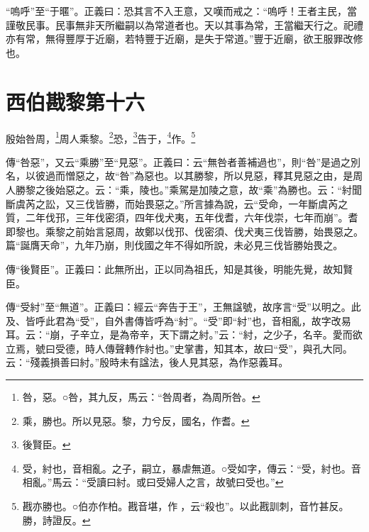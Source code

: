 {\noindent\shu{}\fzkt “嗚呼”至“于暱”。正義曰：恐其言不入王意，又嘆而戒之：“嗚呼！王者主民，當謹敬民事。民事無非天所繼嗣以為常道者也。天以其事為常，王當繼天行之。祀禮亦有常，無得豐厚于近廟，若特豐于近廟，是失于常道。”豐于近廟，欲王服罪改修也。 \par}

\section{西伯戡黎第十六}


殷始咎周，\footnote{咎，惡。○咎，其九反，馬云：“咎周者，為周所咎。}周人乘黎。\footnote{乘，勝也。所以見惡。黎，力兮反，國名，作耆。}恐，\footnote{後賢臣。}告于，\footnote{受，紂也，音相亂。之子，嗣立，暴虐無道。○受如字，傳云：“受，紂也。音相亂。”馬云：“受讀曰紂。或曰受婦人之言，故號曰受也。”}作。\footnote{戡亦勝也。○伯亦作柏。戡音堪，作𢦟，云“殺也”。以此戡訓刺，音竹甚反。勝，詩證反。}

{\noindent\zhuan{}\fzbyks 傳“咎惡”，又云“乘勝”至“見惡”。正義曰：云“無咎者善補過也”，則“咎”是過之別名，以彼過而憎惡之，故“咎”為惡也。以其勝黎，所以見惡，釋其見惡之由，是周人勝黎之後始惡之。云：“乘，陵也。”乘駕是加陵之意，故“乘”為勝也。云：“紂聞斷虞芮之訟，又三伐皆勝，而始畏惡之。”所言據為說，云“受命，一年斷虞芮之質，二年伐邘，三年伐密須，四年伐犬夷，五年伐耆，六年伐崇，七年而崩”。耆即黎也。乘黎之前始言惡周，故鄭以伐邘、伐密須、伐犬夷三伐皆勝，始畏惡之。篇“誕膺天命”，九年乃崩，則伐國之年不得如所說，未必見三伐皆勝始畏之。 \par}

{\noindent\zhuan{}\fzbyks 傳“後賢臣”。正義曰：此無所出，正以同為祖氏，知是其後，明能先覺，故知賢臣。 \par}

{\noindent\zhuan{}\fzbyks 傳“受紂”至“無道”。正義曰：經云“奔告于王”，王無諡號，故序言“受”以明之。此及、皆呼此君為“受”，自外書傳皆呼為“紂”。“受”即“紂”也，音相亂，故字改易耳。云：“崩，子辛立，是為帝辛，天下謂之紂。”云：“紂，之少子，名辛。愛而欲立焉，號曰受德，時人傳聲轉作紂也。”史掌書，知其本，故曰“受”，與孔大同。云：“殘義損善曰紂。”殷時未有諡法，後人見其惡，為作惡義耳。 \par}

